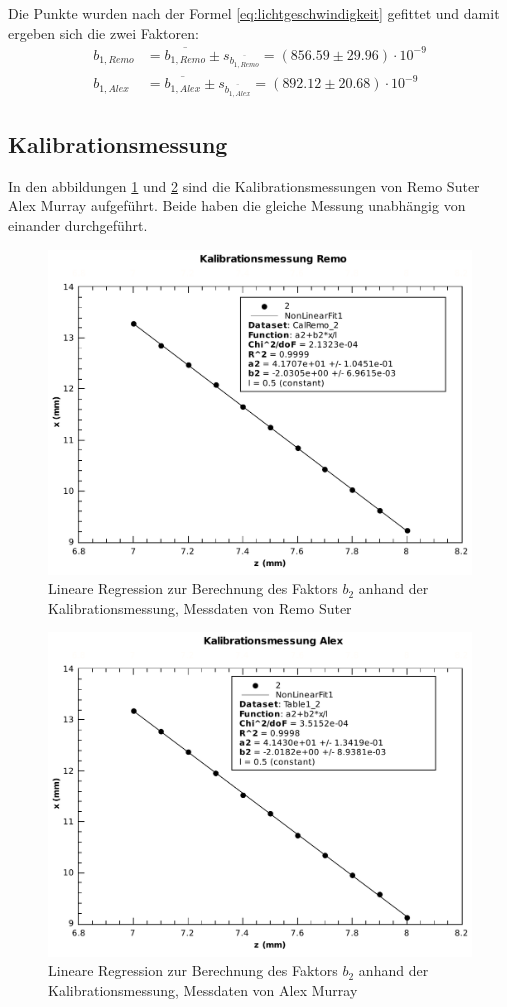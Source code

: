 Die Punkte wurden nach der Formel \ref{eq:lichtgeschwindigkeit} gefittet und damit ergeben sich  die zwei  Faktoren:
\begin{align*}
    b_{1,Remo} &= \overline{b_{1,Remo}} \pm s_{\overline{b_{1,Remo}}} = (856.59 \pm 29.96)\cdot 10^{-9} \\
    b_{1,Alex} &= \overline{b_{1,Alex}} \pm s_{\overline{b_{1,Alex}}} = (892.12 \pm 20.68)\cdot 10^{-9}
\end{align*}


\subsection{Kalibrationsmessung}

In  den  abbildungen  \ref{fig:z-x-remo}  und  \ref{fig:z-x-alex}   sind   die
Kalibrationsmessungen von Remo Suter Alex Murray aufgef\"uhrt. Beide haben die
gleiche Messung unabh\"angig von einander durchgef\"uhrt.

\begin{figure}[H]
    \center
    \includegraphics[width=.65\textwidth]{images/z-x-remo.pdf}
    \caption{Lineare Regression zur Berechnung des Faktors $b_2$ anhand der Kalibrationsmessung, Messdaten von Remo Suter}
    \label{fig:z-x-remo}
\end{figure}

\begin{figure}[H]
    \center
    \includegraphics[width=.65\textwidth]{images/z-x-alex.pdf}
    \caption{Lineare Regression zur Berechnung des Faktors $b_2$ anhand der Kalibrationsmessung, Messdaten von Alex Murray}
    \label{fig:z-x-alex}
\end{figure}


